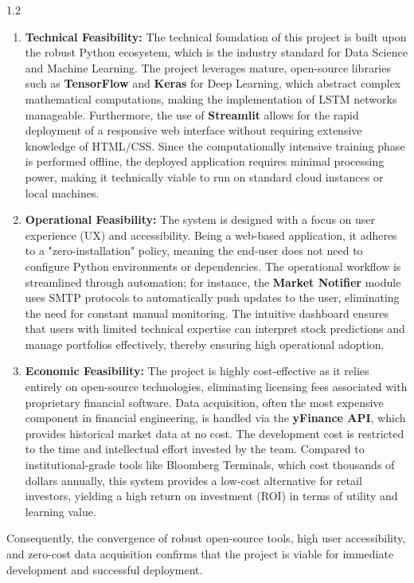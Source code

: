 \documentclass[12pt, a4paper]{report}
\begin{document}
\begin{spacing}{1.2}
\begin{enumerate} \item \textbf{Technical Feasibility:} The technical foundation of this project is built upon the robust Python ecosystem, which is the industry standard for Data Science and Machine Learning. The project leverages mature, open-source libraries such as \textbf{TensorFlow} and \textbf{Keras} for Deep Learning, which abstract complex mathematical computations, making the implementation of LSTM networks manageable. Furthermore, the use of \textbf{Streamlit} allows for the rapid deployment of a responsive web interface without requiring extensive knowledge of HTML/CSS. Since the computationally intensive training phase is performed offline, the deployed application requires minimal processing power, making it technically viable to run on standard cloud instances or local machines.

\item \textbf{Operational Feasibility:} The system is designed with a focus on user experience (UX) and accessibility. Being a web-based application, it adheres to a "zero-installation" policy, meaning the end-user does not need to configure Python environments or dependencies. The operational workflow is streamlined through automation; for instance, the \textbf{Market Notifier} module uses SMTP protocols to automatically push updates to the user, eliminating the need for constant manual monitoring. The intuitive dashboard ensures that users with limited technical expertise can interpret stock predictions and manage portfolios effectively, thereby ensuring high operational adoption.

\item \textbf{Economic Feasibility:} The project is highly cost-effective as it relies entirely on open-source technologies, eliminating licensing fees associated with proprietary financial software. Data acquisition, often the most expensive component in financial engineering, is handled via the \textbf{yFinance API}, which provides historical market data at no cost. The development cost is restricted to the time and intellectual effort invested by the team. Compared to institutional-grade tools like Bloomberg Terminals, which cost thousands of dollars annually, this system provides a low-cost alternative for retail investors, yielding a high return on investment (ROI) in terms of utility and learning value.
\end{enumerate}
Consequently, the convergence of robust open-source tools, high user accessibility, and zero-cost data acquisition confirms that the project is viable for immediate development and successful deployment.


\end{spacing}
\end{document}
